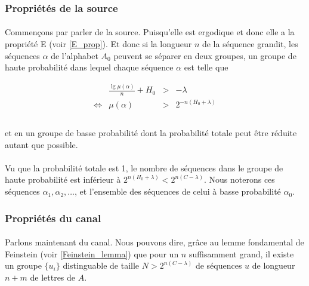 \subsubsection*{Propriétés de la source}
	
	\paragraph{}
	Commençons par parler de la source. Puisqu'elle est ergodique et donc
	elle a la propriété E (voir \ref{E_prop}). Et donc si la longueur $n$
	de la séquence grandit, les séquences $\alpha$ de l'alphabet
	$A_0$ peuvent se séparer en deux groupes, un groupe de haute 
	probabilité dans lequel chaque séquence $\alpha$ est telle que
	
	\[
		\begin{array}{crcl}
			&\frac{\lg \mu\left(\alpha\right)}{n}+H_0 &>& -\lambda\\
			\Leftrightarrow & \mu(\alpha) & > &2^{-n\left(H_0+\lambda\right)}\\
		\end{array}
	\]
	
	\paragraph{}
	et en un groupe de basse probabilité dont la probabilité totale peut être 
	réduite autant que possible.

	\paragraph{}
	Vu que la probabilité totale est 1, le nombre de séquences dans le groupe
	de haute probabilité est inférieur à $2^{n(H_0+\lambda)}<2^{n(C-\lambda)}$.
	Nous noterons ces séquences $\alpha_1,\alpha_2,\dots$, et l'ensemble des
	séquences de celui à basse probabilité $\alpha_0$.
	
\subsubsection*{Propriétés du canal}
	
	\paragraph{}
	Parlons maintenant du canal. Nous pouvons dire, grâce au lemme fondamental
	de Feinstein (voir \ref{Feinstein_lemma}) que pour un $n$ suffisamment
	grand, il existe un groupe $\{u_i\}$ distinguable de taille 
	$N > 2^{n(C-\lambda)}$ de séquences $u$ de longueur $n+m$ de lettres 
	de $A$.
	
